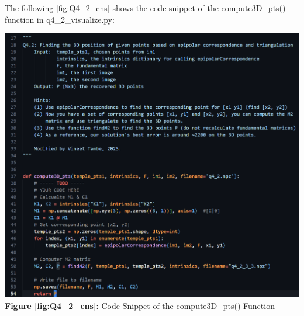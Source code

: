 \newpage
\begin{your_solution}[title=Q4.2 continued,height=18.5cm,width=\linewidth]
	The following \autoref{fig:Q4_2_cns} shows the code snippet of the compute3D\_pts() function in q4\_2\_visualize.py:	
	\newline
	
	
	\begin{minipage}{1\linewidth}
		\centering
		\includegraphics[width=1\linewidth, height=1\columnwidth]{../Q4_2_cns.png}
		\textbf{Figure \ref{fig:Q4_2_cns}:} Code Snippet of the compute3D\_pts() Function  %
		\label{fig:Q4_2_cns}         %
	\end{minipage}
\end{your_solution}